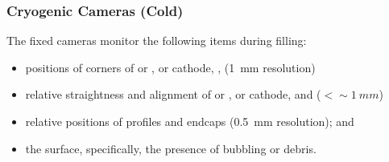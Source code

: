 
\subsubsection{Cryogenic Cameras (Cold)}

The fixed cameras
monitor the following items during filling:
\begin{itemize}
\item positions of corners of  or ,  or cathode, ,  (\SI{1}{mm} resolution)
\item relative straightness and alignment of  or ,  or cathode, and  (\(<\sim\SI{1}{mm}\))
\item relative positions of profiles and endcaps (\SI{0.5}{mm} resolution); and 
\item the \lar surface, specifically, the presence of bubbling or debris.
\end{itemize}




